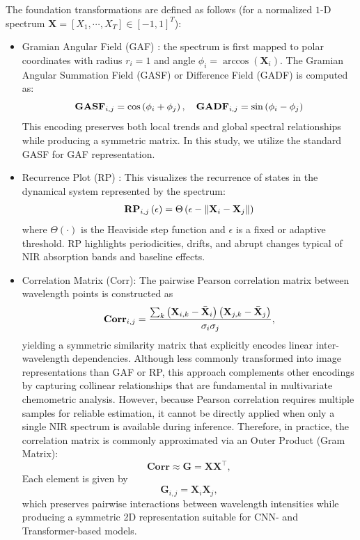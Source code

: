 \documentclass[pdflatex,sn-mathphys-num]{sn-jnl}%
\begin{document}
The foundation transformations are defined as follows (for a normalized $1$-D spectrum $\textbf{X} = \left[X_1, \cdots, X_T \right]\in \left[-1, 1\right]^T$):
\begin{itemize}
    \item Gramian Angular Field (GAF) \cite{wang2015imaging}: the spectrum is first mapped to polar coordinates with radius $r_i=1$ and angle $\phi_i = \arccos(\mathbf{X}_i)$. The Gramian Angular Summation Field (GASF) or Difference Field (GADF) is computed as:
    \begin{equation}
        \text{\textbf{GASF}}_{i,j} = \cos\left(\phi_i + \phi_j\right), \quad \text{\textbf{GADF}}_{i,j} = \sin\left(\phi_i - \phi_j\right)
    \end{equation}
    This encoding preserves both local trends and global spectral relationships while producing a symmetric matrix. In this study, we utilize the standard GASF for GAF representation.
    \item Recurrence Plot (RP) \cite{eckmann1995recurrence}: This visualizes the recurrence of states in the dynamical system represented by the spectrum:
    \begin{equation}
        \text{\textbf{RP}}_{i,j}\left(\epsilon\right) = \Theta\left(\epsilon - \left\Vert \mathbf{X}_i - \mathbf{X}_j \right\Vert\right)
    \end{equation}
    where $\Theta(\cdot)$  is the Heaviside step function and $\epsilon$ is a fixed or adaptive threshold. RP highlights periodicities, drifts, and abrupt changes typical of NIR absorption bands and baseline effects.
    \item Correlation Matrix (Corr): The pairwise Pearson correlation matrix between wavelength points is constructed as
    \begin{equation}
        \text{\textbf{Corr}}_{i,j} = \frac{\sum_k{\left(\mathbf{X}_{i,k} - \bar{\mathbf{X}}_i\right)\left(\mathbf{X}_{j,k} - \bar{\mathbf{X}}_{j}\right)}}{\sigma_i\sigma_j},
    \end{equation}
    yielding a symmetric similarity matrix that explicitly encodes linear inter-wavelength dependencies. Although less commonly transformed into image representations than GAF or RP, this approach complements other encodings by capturing collinear relationships that are fundamental in multivariate chemometric analysis. However, because Pearson correlation requires multiple samples for reliable estimation, it cannot be directly applied when only a single NIR spectrum is available during inference. Therefore, in practice, the correlation matrix is commonly approximated via an Outer Product (Gram Matrix):
    \begin{equation}
        \mathbf{Corr} \approx \mathbf{G} = \mathbf{X}\mathbf{X}^\top,
    \end{equation}
    Each element is given by
    \begin{equation}
        \mathbf{G}_{i,j} = \mathbf{X}_i\mathbf{X}_j,
    \end{equation}
    which preserves pairwise interactions between wavelength intensities while producing a symmetric 2D representation suitable for CNN- and Transformer-based models.
\end{itemize}
\end{document}
